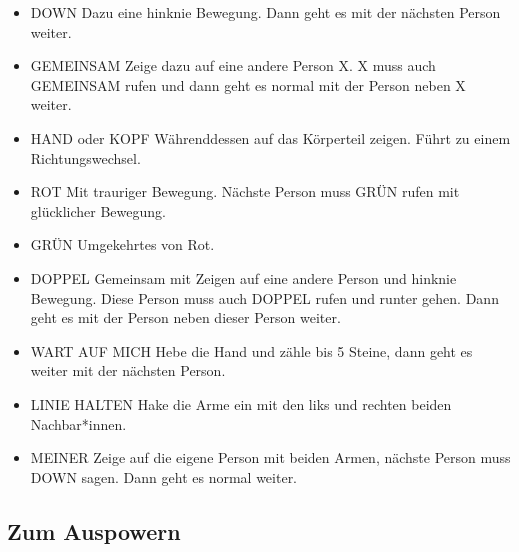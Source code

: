\begin{itemize}
    \item DOWN\newline
    Dazu eine hinknie Bewegung. Dann geht es mit der nächsten Person weiter.

    \item GEMEINSAM\newline
    Zeige dazu auf eine andere Person X. X muss auch GEMEINSAM rufen und dann geht es normal mit der Person neben X weiter. 

    \item HAND oder KOPF\newline
    Währenddessen auf das Körperteil zeigen. Führt zu einem Richtungswechsel.

    \item ROT\newline
    Mit trauriger Bewegung. Nächste Person muss GRÜN rufen mit glücklicher Bewegung.

    \item GRÜN\newline
    Umgekehrtes von Rot. 

    \item DOPPEL\newline
    Gemeinsam mit Zeigen auf eine andere Person und hinknie Bewegung. Diese Person muss auch DOPPEL rufen und runter gehen. Dann geht es mit der Person neben dieser Person weiter. 

    \item WART AUF MICH \newline
    Hebe die Hand und zähle bis 5 Steine, dann geht es weiter mit der nächsten Person.

    \item LINIE HALTEN \newline
    Hake die Arme ein mit den liks und rechten beiden Nachbar*innen. 

    \item MEINER \newline
    Zeige auf die eigene Person mit beiden Armen, nächste Person muss DOWN sagen. Dann geht es normal weiter. 
    
\end{itemize}

\newpage


\subsection*{\centering \LARGE Zum Auspowern}

